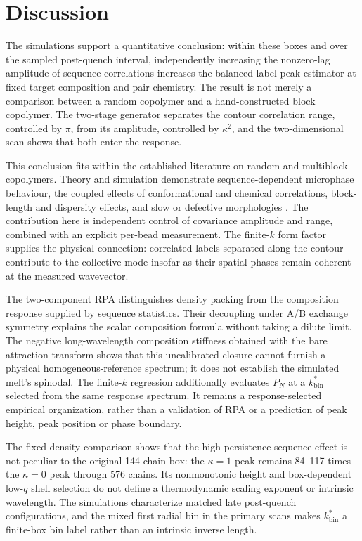 \documentclass[pdflatex,sn-nature,onecolumn]{sn-jnl}
\begin{document}
\section{Discussion}

The simulations support a quantitative conclusion: within these boxes and over the sampled post-quench interval, independently increasing the nonzero-lag amplitude of sequence correlations increases the balanced-label peak estimator at fixed target composition and pair chemistry. The result is not merely a comparison between a random copolymer and a hand-constructed block copolymer. The two-stage generator separates the contour correlation range, controlled by $\pi$, from its amplitude, controlled by $\kappa^2$, and the two-dimensional scan shows that both enter the response.

This conclusion fits within the established literature on random and multiblock copolymers. Theory and simulation demonstrate sequence-dependent microphase behaviour, the coupled effects of conformational and chemical correlations, block-length and dispersity effects, and slow or defective morphologies \cite{FredricksonMilnerLeibler1992,Gavrilov2011CPL,Govorun2017,MaoSpakowitz2016,Patyukova2021,Rudyak2022,Steinmuller2012Morph}. The contribution here is independent control of covariance amplitude and range, combined with an explicit per-bead measurement. The finite-$k$ form factor supplies the physical connection: correlated labels separated along the contour contribute to the collective mode insofar as their spatial phases remain coherent at the measured wavevector.

The two-component RPA distinguishes density packing from the composition response supplied by sequence statistics. Their decoupling under A/B exchange symmetry explains the scalar composition formula without taking a dilute limit. The negative long-wavelength composition stiffness obtained with the bare attraction transform shows that this uncalibrated closure cannot furnish a physical homogeneous-reference spectrum; it does not establish the simulated melt's spinodal. The finite-$k$ regression additionally evaluates $P_N$ at a $k_{\mathrm{bin}}^*$ selected from the same response spectrum. It remains a response-selected empirical organization, rather than a validation of RPA or a prediction of peak height, peak position or phase boundary.

The fixed-density comparison shows that the high-persistence sequence effect is not peculiar to the original 144-chain box: the $\kappa=1$ peak remains 84--117 times the $\kappa=0$ peak through 576 chains. Its nonmonotonic height and box-dependent low-$q$ shell selection do not define a thermodynamic scaling exponent or intrinsic wavelength. The simulations characterize matched late post-quench configurations, and the mixed first radial bin in the primary scans makes $k_{\mathrm{bin}}^*$ a finite-box bin label rather than an intrinsic inverse length.
\end{document}
